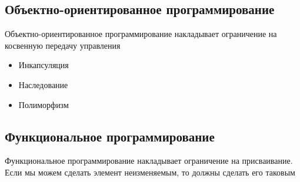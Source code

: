\subsection{Объектно-ориентированное программирование}

Объектно-ориентированное программирование накладывает ограничение
на косвенную передачу управления

\begin{itemize}
    \item Инкапсуляция
    \item Наследование
    \item Полиморфизм
\end{itemize}

\subsection{Функциональное программирование}

Функциональное программирование накладывает ограничение на
присваивание. Если мы можем сделать элемент неизменяемым, то
должны сделать его таковым
